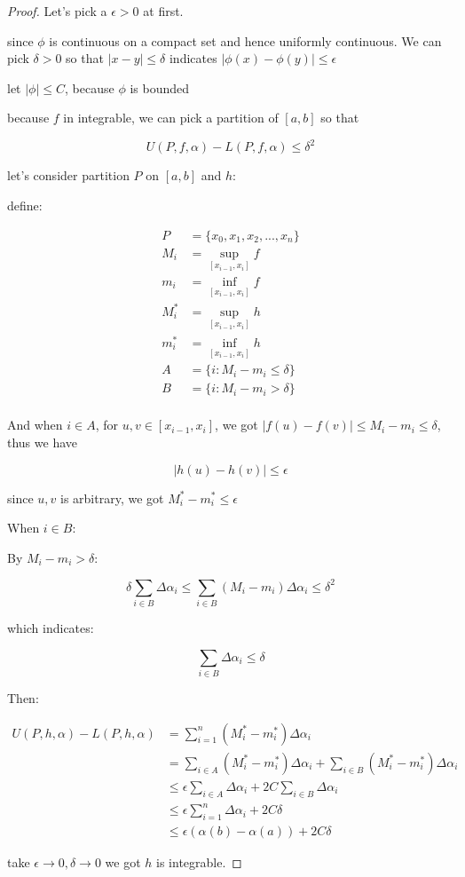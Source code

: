 \begin{proof}
    Let's pick a $\epsilon > 0$ at first.

   since $\phi$ is continuous on a compact set and hence uniformly continuous. We can pick $\delta > 0$ so that $|x-y| \le \delta$ indicates $|\phi(x) - \phi(y)| \le \epsilon $

   let $\left| \phi \right| \le C$, because $\phi$ is bounded

   because $f$ in integrable, we can pick a partition of $[a,b]$ so that

   \[
    U(P,f,\alpha) - L(P,f,\alpha) \le \delta^2
   \]

    let's consider partition $P$ on $[a,b]$ and $h$:

    define:

    \begin{align*}
        P &= \{ x_0, x_1,x_2,...,x_n \} \\
        M_i &= \sup_{[x_{i-1}, x_i]} f \\
        m_i &= \inf_{[x_{i-1}, x_i]} f \\
        M^*_i &= \sup_{[x_{i-1}, x_i]} h \\
        m^*_i &= \inf_{[x_{i-1}, x_i]} h \\
        A &= \{ i: M_i - m_i \le \delta \} \\
        B &= \{ i: M_i - m_i > \delta \} \\
    \end{align*}

    And when $i \in A$, for $u,v \in [x_{i-1}, x_i]$, we got $|f(u) - f(v)| \le M_i - m_i \le \delta$, thus we have

    \[
        |h(u) - h(v)| \le \epsilon
    \]

    since $u,v$ is arbitrary, we got $M^*_i - m^*_i \le \epsilon $

    When $i \in B$:

    By $M_i - m_i > \delta$:

    \[
 \delta \sum_{i \in B} \Delta \alpha_i       \le \sum_{i \in B}\left( M_i - m_i \right) \Delta \alpha_i \le \delta^2
    \]

    which indicates:

    \[
        \sum_{i \in B} \Delta \alpha_i \le \delta
    \]


    Then:

    \begin{align*}
        U(P,h, \alpha) - L(P,h,\alpha) &= \sum_{i=1}^{n}\left( M^*_i - m^*_i \right) \Delta \alpha_i \\
        &= \sum_{i \in A}\left( M^*_i - m^*_i \right) \Delta \alpha_i + \sum_{i \in B}\left( M^*_i - m^*_i \right) \Delta \alpha_i \\
        & \le \epsilon \sum_{i \in A} \Delta \alpha_i + 2C \sum_{i \in B} \Delta \alpha_i \\
        & \le \epsilon \sum_{i=1}^{n} \Delta \alpha_i + 2C \delta \\
        & \le \epsilon \left( \alpha(b) - \alpha(a)\right) + 2C \delta
    \end{align*}

    take $\epsilon \to 0, \delta \to 0$ we got $h$ is integrable.
\end{proof}


